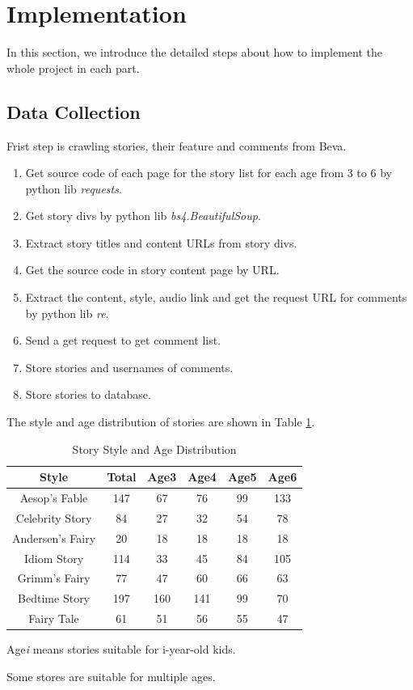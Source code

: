 \documentclass[sigconf]{acmart}
\begin{document}
\section{Implementation}
In this section, we introduce the detailed steps about how to implement the whole project in each part.

\subsection{Data Collection}
Frist step is crawling stories, their feature and comments from Beva.
\begin{enumerate}
\item Get source code of each page for the story list for each age from 3 to 6 by python lib \emph{requests}.  
\item Get story divs by python lib \emph{bs4.BeautifulSoup}.
\item Extract story titles and content URLs from story divs.
\item Get the source code in story content page by URL.
\item Extract the content, style, audio link and get the request URL for comments by python lib \emph{re}.
\item Send a get request to get comment list.
\item Store stories and usernames of comments.
\item Store stories to database.
\end{enumerate}
The style and age distribution of stories are shown in Table \ref{tab:style_age_d}.
\\
\begin{table}
  \caption{Story Style and Age Distribution}
  \label{tab:style_age_d}
  \begin{threeparttable}
  \begin{tabular}{c|ccccc}
    \toprule
    Style & Total & Age3 & Age4 & Age5 & Age6\\
    \midrule
    Aesop's Fable & 147 & 67 & 76 & 99 & 133 \\
	Celebrity Story & 84 & 27 & 32 & 54 & 78 \\
	Andersen's Fairy & 20 & 18 & 18 & 18 & 18 \\
	Idiom Story  & 114 & 33 & 45 & 84 & 105 \\
	Grimm's Fairy & 77 & 47 & 60 & 66 & 63 \\
	Bedtime Story & 197 & 160 & 141 & 99 & 70 \\
	Fairy Tale & 61 & 51 & 56 & 55 & 47 \\
  \bottomrule
\end{tabular}
\begin{tablenotes}
        \footnotesize
        \item[1] Age\emph{i} means stories suitable for i-year-old kids.
        \item[2] Some stores are suitable for multiple ages.
      \end{tablenotes}
  \end{threeparttable}
\end{table}
\end{document}
